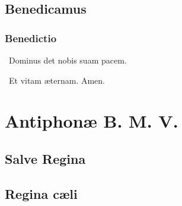 \documentclass[initial=ZallmanCaps,staff=19,font=greciliae,11pt,a4paper,openany,twoside,choralsign=PfefferMediaeval]{gregorian}
\begin{document}
\section*{Benedicamus}
\par
{}
\par
\subsection*{Benedictio}
\Vbar~Dominus det nobis suam pacem.\par
\Rbar~Et vitam æternam. Amen.
\begin{center}
{\centering{\scalebox{3}{\grecross}}}
\end{center}
\chapter{Antiphonæ B. M. V.}
\section*{Salve Regina}\par
{}
\newpage
\section*{Regina cæli}\par
{}
\par
\begin{center}
{\centering{\scalebox{3}{\grecross}}}
\end{center}
\end{document}
